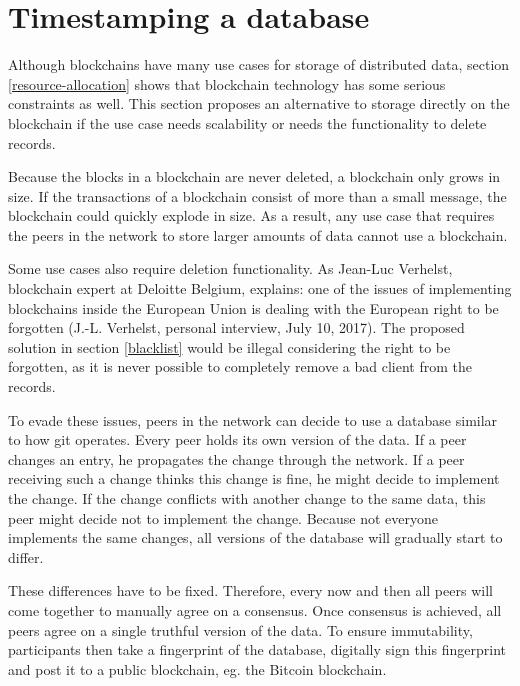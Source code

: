 \section{Timestamping a database}
\label{timestamping-db}


Although blockchains have many use cases for storage of distributed data, section \ref{resource-allocation} shows that blockchain technology has some serious constraints as well. This section proposes an alternative to storage directly on the blockchain if the use case needs scalability or needs the functionality to delete records. 

Because the blocks in a blockchain are never deleted, a blockchain only grows in size. If the transactions of a blockchain consist of more than a small message, the blockchain could quickly explode in size. As a result, any use case that requires the peers in the network to store larger amounts of data cannot use a blockchain.

Some use cases also require deletion functionality. As Jean-Luc Verhelst, blockchain expert at Deloitte Belgium, explains: one of the issues of implementing blockchains inside the European Union is dealing with the European right to be forgotten (J.-L. Verhelst, personal interview, July 10, 2017). The proposed solution in section \ref{blacklist} would be illegal considering the right to be forgotten, as it is never possible to completely remove a bad client from the records. 

To evade these issues, peers in the network can decide to use a database similar to how git operates. Every peer holds its own version of the data. If a peer changes an entry, he propagates the change through the network. If a peer receiving such a change thinks this change is fine, he might decide to implement the change. If the change conflicts with another change to the same data, this peer might decide not to implement the change. Because not everyone implements the same changes, all versions of the database will gradually start to differ. 

These differences have to be fixed. Therefore, every now and then all peers will come together to manually agree on a consensus. Once consensus is achieved, all peers agree on a single truthful version of the data. To ensure immutability, participants then take a fingerprint of the database, digitally sign this fingerprint and post it to a public blockchain, eg. the Bitcoin blockchain.

